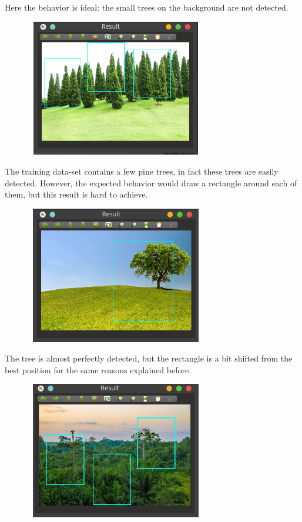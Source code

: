 \documentclass[]{report}
\begin{document}
Here the behavior is ideal: the small trees on the background are not detected.

\vspace{0.5cm}
\begin{center}
	\includegraphics[width=10cm,height=6cm]{img/final/10}
\end{center}
\vspace{0.5cm}

The training data-set contains a few pine trees, in fact these trees are easily detected. However, the expected behavior would draw a rectangle around each of them, but this result is hard to achieve.

\vspace{0.5cm}
\begin{center}
	\includegraphics[width=10cm,height=6cm]{img/final/11}
\end{center}
\vspace{0.5cm}

The tree is almost perfectly detected, but the rectangle is a bit shifted from the best position for the same reasons explained before.

\vspace{0.5cm}
\begin{center}
	\includegraphics[width=10cm,height=6cm]{img/final/12}
\end{center}
\vspace{0.5cm}
\end{document}
